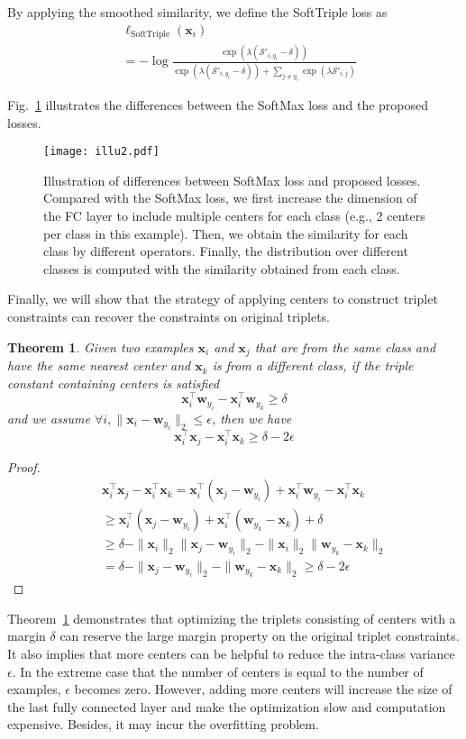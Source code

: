 \documentclass[10pt,twocolumn,letterpaper]{article}
\def \x {\mathbf{x}}
\def \w {\mathbf{w}}
\newtheorem{thm}{Theorem}
\begin{document}
By applying the smoothed similarity, we define the SoftTriple loss as
\begin{align}\label{eq:softtrip}
&\ell_{\mathrm{SoftTriple}}(\x_i) \nonumber\\
&= -\log\frac{\exp(\lambda(\mathcal{S}'_{i,y_i}-\delta))}{\exp(\lambda(\mathcal{S}'_{i,y_i}-\delta))+\sum_{j\not=y_i}\exp(\lambda\mathcal{S}'_{i,j})  }
\end{align}

Fig.~\ref{fig:illu2} illustrates the differences between the SoftMax loss and the proposed losses. 
\begin{figure}[!ht]
\centering
\texttt{[image: illu2.pdf]}
\caption{Illustration of differences between SoftMax loss and proposed losses. Compared with the SoftMax loss, we first increase the dimension of the FC layer to include multiple centers for each class (e.g., 2 centers per class in this example). Then, we obtain the similarity for each class by different operators. Finally, the distribution over different classes is computed with the similarity obtained from each class.\label{fig:illu2}}
\end{figure}

Finally, we will show that the strategy of applying centers to construct triplet constraints can recover the constraints on original triplets. 
\begin{thm}\label{thm:1}
Given two examples $\x_i$ and $\x_j$ that are from the same class and have the same nearest center and $\x_k$ is from a different class, if the triple constant containing centers is satisfied
\[\x_i^\top\w_{y_i} - \x_i^\top\w_{y_k}\geq \delta\]
and we assume $\forall i, \|\x_i-\w_{y_i}\|_2\leq \epsilon$, then we have
\[\x_i^\top \x_j - \x_i^\top\x_k\geq \delta-2\epsilon \]
\end{thm}
\begin{proof}
\begin{eqnarray*}
&&\x_i^\top \x_j - \x_i^\top\x_k  = \x_i^\top (\x_j-\w_{y_i})+\x_i^\top\w_{y_i} - \x_i^\top\x_k\\
&&\geq \x_i^\top (\x_j-\w_{y_i})+\x_i^\top(\w_{y_k} - \x_k)+\delta\\
&&\geq \delta - \|\x_i\|_2\|\x_j-\w_{y_i}\|_2-\|\x_i\|_2\|\w_{y_k} - \x_k\|_2\\
&&=\delta - \|\x_j-\w_{y_i}\|_2-\|\w_{y_k} - \x_k\|_2 \geq \delta - 2\epsilon
\end{eqnarray*}
\end{proof}

Theorem~\ref{thm:1} demonstrates that optimizing the triplets consisting of centers with a margin $\delta$ can reserve the large margin property on the original triplet constraints. It also implies that more centers can be helpful to reduce the intra-class variance $\epsilon$. In the extreme case that the number of centers is equal to the number of examples, $\epsilon$ becomes zero. However, adding more centers will increase the size of the last fully connected layer and make the optimization slow and computation expensive. Besides, it may incur the overfitting problem.
\end{document}

